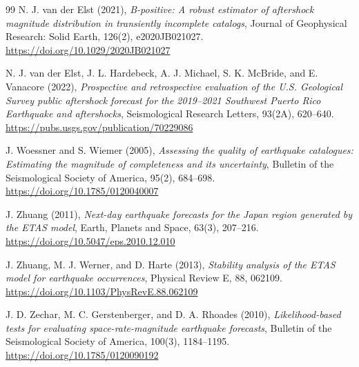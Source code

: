 \documentclass[12pt,letterpaper]{article}
\begin{document}
\begin{thebibliography}{99}
N. J. van der Elst (2021),
\emph{B-positive: A robust estimator of aftershock magnitude distribution in
transiently incomplete catalogs},
Journal of Geophysical Research: Solid Earth, 126(2), e2020JB021027.\\
\url{https://doi.org/10.1029/2020JB021027}

N. J. van der Elst, J. L. Hardebeck, A. J. Michael, S. K. McBride, and
E. Vanacore (2022),
\emph{Prospective and retrospective evaluation of the U.S. Geological Survey
public aftershock forecast for the 2019--2021 Southwest Puerto Rico
Earthquake and aftershocks},
Seismological Research Letters, 93(2A), 620--640.\\
\url{https://pubs.usgs.gov/publication/70229086}

J. Woessner and S. Wiemer (2005),
\emph{Assessing the quality of earthquake catalogues: Estimating the
magnitude of completeness and its uncertainty},
Bulletin of the Seismological Society of America, 95(2), 684--698.\\
\url{https://doi.org/10.1785/0120040007}

J. Zhuang (2011),
\emph{Next-day earthquake forecasts for the Japan region generated by the
ETAS model},
Earth, Planets and Space, 63(3), 207--216.\\
\url{https://doi.org/10.5047/eps.2010.12.010}

J. Zhuang, M. J. Werner, and D. Harte (2013),
\emph{Stability analysis of the ETAS model for earthquake occurrences},
Physical Review E, 88, 062109.\\
\url{https://doi.org/10.1103/PhysRevE.88.062109}

J. D. Zechar, M. C. Gerstenberger, and D. A. Rhoades (2010),
\emph{Likelihood-based tests for evaluating space-rate-magnitude earthquake
forecasts},
Bulletin of the Seismological Society of America, 100(3), 1184--1195.\\
\url{https://doi.org/10.1785/0120090192}

\end{thebibliography}
\end{document}

